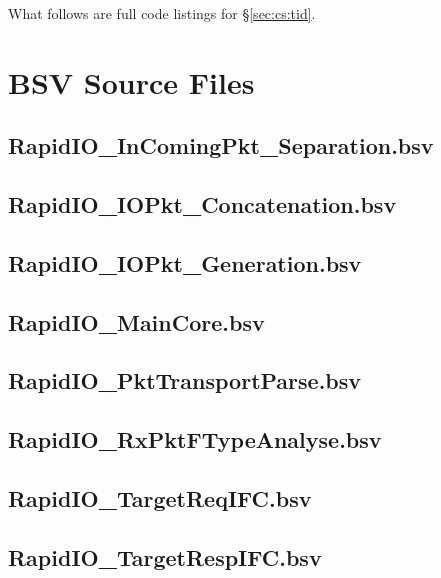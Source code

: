 What follows are full code listings for \S \ref{sec:cs:tid}.  

\section{BSV Source Files} \label{app:tid:bsv}
\subsection{RapidIO\_InComingPkt\_Separation.bsv} \label{app:tid:bsv:sep}


\subsection{RapidIO\_IOPkt\_Concatenation.bsv} \label{app:tid:bsv:conc}


\subsection{RapidIO\_IOPkt\_Generation.bsv} \label{app:tid:bsv:gen}


\subsection{RapidIO\_MainCore.bsv} \label{app:tid:bsv:main}


\subsection{RapidIO\_PktTransportParse.bsv} \label{app:tid:bsv:parse}


\subsection{RapidIO\_RxPktFTypeAnalyse.bsv} \label{app:tid:bsv:analyse}


\subsection{RapidIO\_TargetReqIFC.bsv} \label{app:tid:bsv:req}


\subsection{RapidIO\_TargetRespIFC.bsv} \label{app:tid:bsv:resp}
